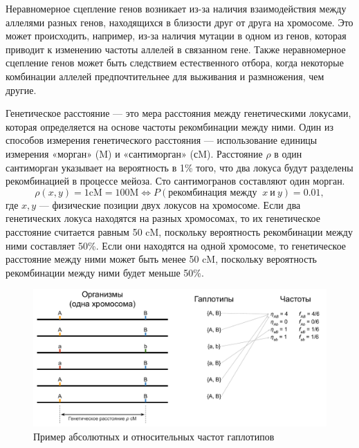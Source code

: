 Неравномерное сцепление генов возникает из-за наличия взаимодействия между аллелями разных генов, находящихся в близости друг от друга на хромосоме.
Это может происходить, например, из-за наличия мутации в одном из генов, которая приводит к изменению частоты аллелей в связанном гене.
Также неравномерное сцепление генов может быть следствием естественного отбора, когда некоторые комбинации аллелей предпочтительнее для выживания и размножения, чем другие.

Генетическое расстояние --- это мера расстояния между генетическими локусами, которая определяется на основе частоты рекомбинации между ними.
Один из способов измерения генетического расстояния --- использование единицы измерения «морган» (M) и «сантиморган» (сM).
Расстояние $\rho$ в один сантиморган указывает на вероятность в 1\% того, что два локуса будут разделены рекомбинацией в процессе мейоза.
Сто сантимогранов составляют один морган.
$$\rho(x, y) = 1 \text{cM} = 100 \text{M} \Leftrightarrow P(\text{рекомбинация между }\ x\ \text{и}\ y) = 0.01,$$
где $x, y$ --- физические позиции двух локусов на хромосоме.
Если два генетических локуса находятся на разных хромосомах, то их генетическое расстояние считается равным 50 cM, поскольку вероятность рекомбинации между ними составляет 50\%.
Если они находятся на одной хромосоме, то генетическое расстояние между ними может быть менее 50 cM, поскольку вероятность рекомбинации между ними будет меньше 50\%.

\begin{figure}[t]
    \centering
    \includegraphics[width=\textwidth]{images/part1/data/two_locus.pdf}
    \caption{Пример абсолютных и относительных частот гаплотипов}
    \label{fig:part1:dem_inf:haplotype_freq}
\end{figure}

